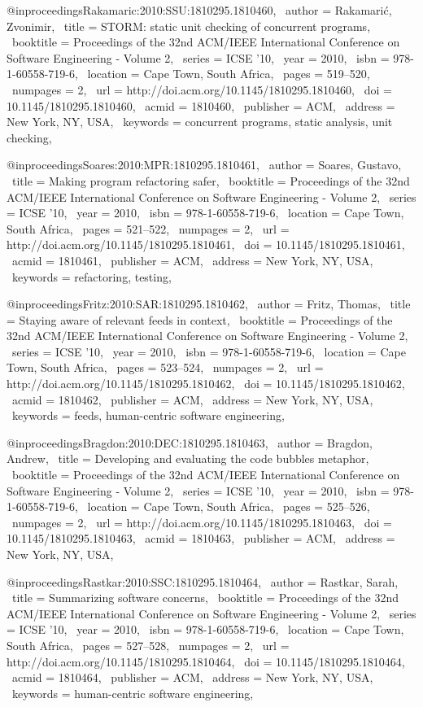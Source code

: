 @inproceedings{Rakamaric:2010:SSU:1810295.1810460,
 author = {Rakamari\'{c}, Zvonimir},
 title = {STORM: static unit checking of concurrent programs},
 booktitle = {Proceedings of the 32nd ACM/IEEE International Conference on Software Engineering - Volume 2},
 series = {ICSE '10},
 year = {2010},
 isbn = {978-1-60558-719-6},
 location = {Cape Town, South Africa},
 pages = {519--520},
 numpages = {2},
 url = {http://doi.acm.org/10.1145/1810295.1810460},
 doi = {10.1145/1810295.1810460},
 acmid = {1810460},
 publisher = {ACM},
 address = {New York, NY, USA},
 keywords = {concurrent programs, static analysis, unit checking},
} 

@inproceedings{Soares:2010:MPR:1810295.1810461,
 author = {Soares, Gustavo},
 title = {Making program refactoring safer},
 booktitle = {Proceedings of the 32nd ACM/IEEE International Conference on Software Engineering - Volume 2},
 series = {ICSE '10},
 year = {2010},
 isbn = {978-1-60558-719-6},
 location = {Cape Town, South Africa},
 pages = {521--522},
 numpages = {2},
 url = {http://doi.acm.org/10.1145/1810295.1810461},
 doi = {10.1145/1810295.1810461},
 acmid = {1810461},
 publisher = {ACM},
 address = {New York, NY, USA},
 keywords = {refactoring, testing},
} 

@inproceedings{Fritz:2010:SAR:1810295.1810462,
 author = {Fritz, Thomas},
 title = {Staying aware of relevant feeds in context},
 booktitle = {Proceedings of the 32nd ACM/IEEE International Conference on Software Engineering - Volume 2},
 series = {ICSE '10},
 year = {2010},
 isbn = {978-1-60558-719-6},
 location = {Cape Town, South Africa},
 pages = {523--524},
 numpages = {2},
 url = {http://doi.acm.org/10.1145/1810295.1810462},
 doi = {10.1145/1810295.1810462},
 acmid = {1810462},
 publisher = {ACM},
 address = {New York, NY, USA},
 keywords = {feeds, human-centric software engineering},
} 

@inproceedings{Bragdon:2010:DEC:1810295.1810463,
 author = {Bragdon, Andrew},
 title = {Developing and evaluating the code bubbles metaphor},
 booktitle = {Proceedings of the 32nd ACM/IEEE International Conference on Software Engineering - Volume 2},
 series = {ICSE '10},
 year = {2010},
 isbn = {978-1-60558-719-6},
 location = {Cape Town, South Africa},
 pages = {525--526},
 numpages = {2},
 url = {http://doi.acm.org/10.1145/1810295.1810463},
 doi = {10.1145/1810295.1810463},
 acmid = {1810463},
 publisher = {ACM},
 address = {New York, NY, USA},
} 

@inproceedings{Rastkar:2010:SSC:1810295.1810464,
 author = {Rastkar, Sarah},
 title = {Summarizing software concerns},
 booktitle = {Proceedings of the 32nd ACM/IEEE International Conference on Software Engineering - Volume 2},
 series = {ICSE '10},
 year = {2010},
 isbn = {978-1-60558-719-6},
 location = {Cape Town, South Africa},
 pages = {527--528},
 numpages = {2},
 url = {http://doi.acm.org/10.1145/1810295.1810464},
 doi = {10.1145/1810295.1810464},
 acmid = {1810464},
 publisher = {ACM},
 address = {New York, NY, USA},
 keywords = {human-centric software engineering},
} 

